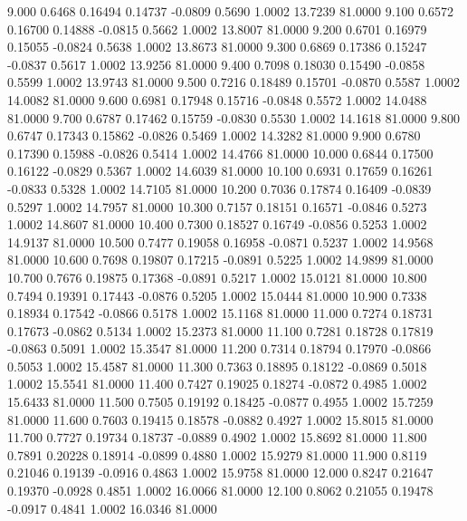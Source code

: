    9.000   0.6468   0.16494   0.14737  -0.0809   0.5690   1.0002  13.7239  81.0000
   9.100   0.6572   0.16700   0.14888  -0.0815   0.5662   1.0002  13.8007  81.0000
   9.200   0.6701   0.16979   0.15055  -0.0824   0.5638   1.0002  13.8673  81.0000
   9.300   0.6869   0.17386   0.15247  -0.0837   0.5617   1.0002  13.9256  81.0000
   9.400   0.7098   0.18030   0.15490  -0.0858   0.5599   1.0002  13.9743  81.0000
   9.500   0.7216   0.18489   0.15701  -0.0870   0.5587   1.0002  14.0082  81.0000
   9.600   0.6981   0.17948   0.15716  -0.0848   0.5572   1.0002  14.0488  81.0000
   9.700   0.6787   0.17462   0.15759  -0.0830   0.5530   1.0002  14.1618  81.0000
   9.800   0.6747   0.17343   0.15862  -0.0826   0.5469   1.0002  14.3282  81.0000
   9.900   0.6780   0.17390   0.15988  -0.0826   0.5414   1.0002  14.4766  81.0000
  10.000   0.6844   0.17500   0.16122  -0.0829   0.5367   1.0002  14.6039  81.0000
  10.100   0.6931   0.17659   0.16261  -0.0833   0.5328   1.0002  14.7105  81.0000
  10.200   0.7036   0.17874   0.16409  -0.0839   0.5297   1.0002  14.7957  81.0000
  10.300   0.7157   0.18151   0.16571  -0.0846   0.5273   1.0002  14.8607  81.0000
  10.400   0.7300   0.18527   0.16749  -0.0856   0.5253   1.0002  14.9137  81.0000
  10.500   0.7477   0.19058   0.16958  -0.0871   0.5237   1.0002  14.9568  81.0000
  10.600   0.7698   0.19807   0.17215  -0.0891   0.5225   1.0002  14.9899  81.0000
  10.700   0.7676   0.19875   0.17368  -0.0891   0.5217   1.0002  15.0121  81.0000
  10.800   0.7494   0.19391   0.17443  -0.0876   0.5205   1.0002  15.0444  81.0000
  10.900   0.7338   0.18934   0.17542  -0.0866   0.5178   1.0002  15.1168  81.0000
  11.000   0.7274   0.18731   0.17673  -0.0862   0.5134   1.0002  15.2373  81.0000
  11.100   0.7281   0.18728   0.17819  -0.0863   0.5091   1.0002  15.3547  81.0000
  11.200   0.7314   0.18794   0.17970  -0.0866   0.5053   1.0002  15.4587  81.0000
  11.300   0.7363   0.18895   0.18122  -0.0869   0.5018   1.0002  15.5541  81.0000
  11.400   0.7427   0.19025   0.18274  -0.0872   0.4985   1.0002  15.6433  81.0000
  11.500   0.7505   0.19192   0.18425  -0.0877   0.4955   1.0002  15.7259  81.0000
  11.600   0.7603   0.19415   0.18578  -0.0882   0.4927   1.0002  15.8015  81.0000
  11.700   0.7727   0.19734   0.18737  -0.0889   0.4902   1.0002  15.8692  81.0000
  11.800   0.7891   0.20228   0.18914  -0.0899   0.4880   1.0002  15.9279  81.0000
  11.900   0.8119   0.21046   0.19139  -0.0916   0.4863   1.0002  15.9758  81.0000
  12.000   0.8247   0.21647   0.19370  -0.0928   0.4851   1.0002  16.0066  81.0000
  12.100   0.8062   0.21055   0.19478  -0.0917   0.4841   1.0002  16.0346  81.0000
